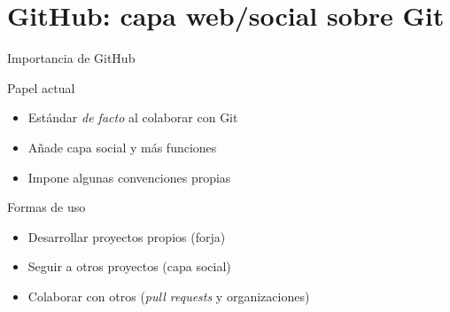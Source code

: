 \documentclass[xcolor=svgnames]{beamer}
\newcommand*{\tipo}[1]{\textit{#1}}
\newcommand*{\inlinecmd}[1]{{\small\ttfamily\nohyphens{#1}}}
\begin{document}

\section[GitHub]{GitHub: capa web/social sobre Git}

\begin{frame}{Importancia de GitHub}
  \begin{block}{Papel actual}
    \begin{itemize}
    \item Estándar \emph{de facto} al colaborar con Git
    \item Añade capa social y más funciones
    \item Impone algunas convenciones propias
    \end{itemize}
  \end{block}

  \begin{block}{Formas de uso}
    \begin{itemize}
    \item Desarrollar proyectos propios (forja)
    \item Seguir a otros proyectos (capa social)
    \item Colaborar con otros (\emph{pull requests} y organizaciones)
    \end{itemize}
  \end{block}
\end{frame}
\end{document}
